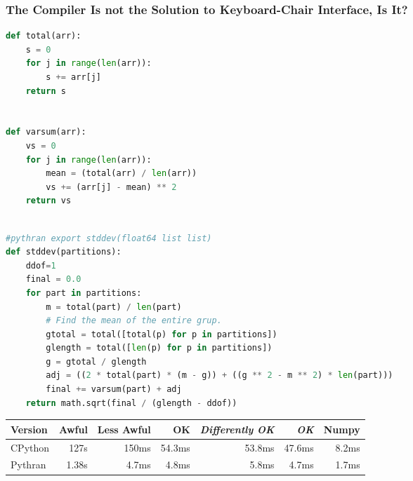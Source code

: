\documentclass[aspectratio=1610]{beamer}
\begin{document}
\begin{frame}[fragile]
  \frametitle{The Compiler Is not the Solution to Keyboard-Chair Interface, Is It?}
    \begin{minipage}{0.49\textwidth}
\begin{lstlisting}[language=Python,frame=none,backgroundcolor=\color{white},basicstyle=\ttfamily\tiny]
def total(arr):
    s = 0
    for j in range(len(arr)):
        s += arr[j]
    return s


def varsum(arr):
    vs = 0
    for j in range(len(arr)):
        mean = (total(arr) / len(arr))
        vs += (arr[j] - mean) ** 2
    return vs
    
\end{lstlisting}
\end{minipage}
\begin{minipage}{0.49\textwidth} \begin{lstlisting}[language=Python,frame=none,backgroundcolor=\color{white},basicstyle=\ttfamily\tiny]
#pythran export stddev(float64 list list)
def stddev(partitions):
    ddof=1
    final = 0.0
    for part in partitions:
        m = total(part) / len(part)
        # Find the mean of the entire grup.
        gtotal = total([total(p) for p in partitions])
        glength = total([len(p) for p in partitions])
        g = gtotal / glength
        adj = ((2 * total(part) * (m - g)) + ((g ** 2 - m ** 2) * len(part)))
        final += varsum(part) + adj
    return math.sqrt(final / (glength - ddof))
\end{lstlisting}
\end{minipage}
\vfill
\begin{tabular}{|l|r|r|r|r|r|r|}
  \hline
  Version  &  Awful     &  Less Awful  &  OK & \textit{Differently OK} & \textit{OK} & Numpy   \\
  \hline
  CPython  & 127s       &   150ms  &   54.3ms  & 53.8ms    & 47.6ms & 8.2ms  \\
  \hline
  Pythran  & 1.38s      &   4.7ms  &   4.8ms   &  5.8ms    &  4.7ms & 1.7ms \\
        \hline
    \end{tabular}

\end{frame}
\end{document}
